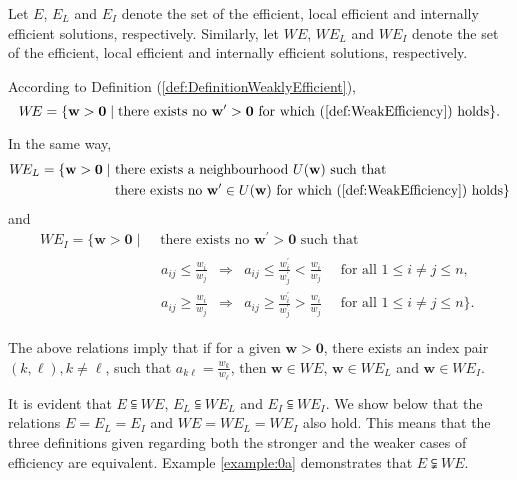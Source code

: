 \documentclass{article}
\theoremstyle{plain}
\begin{document}
Let $E$, $E_L$ and $E_I$
denote the set of the ef{\kern0pt}f{\kern0pt}icient, local ef{\kern0pt}f{\kern0pt}icient and internally ef{\kern0pt}f{\kern0pt}icient solutions, respectively.
Similarly, let $W\!E$, $W\!E_L$ and $W\!E_I$
denote the set of the ef{\kern0pt}f{\kern0pt}icient, local ef{\kern0pt}f{\kern0pt}icient and internally ef{\kern0pt}f{\kern0pt}icient solutions, respectively.

According to Def{\kern0pt}inition  (\ref{def:DefinitionWeaklyEfficient}),
$$  W\!E = \{\mathbf{w}>\mathbf{0}\mid\text{there exists no }\mathbf{w^{\prime}}>\mathbf{0} \text{ for which (\ref{def:WeakEfficiency}) holds}\}.
$$

In the same way,
\begin{align}
  W\!E_L  =\{\mathbf{w}>\mathbf{0}\mid  &\text{ there exists a neighbourhood }
U(\mathbf{w}) \text{ such that} \nonumber \\
  &\text{ there exists no }  \mathbf{w^{\prime}} \in U(\mathbf{w}) \text{ for which }
(\ref{def:WeakEfficiency})
\text{ holds}\} \nonumber
\end{align}
and
\begin{align}
W\!E_I = \{\mathbf{w}>\mathbf{0}\mid  &
 \text{ there exists no }\mathbf{w^{\prime}}>\mathbf{0}
\text{ such that}\nonumber \\
&\begin{array}{lll}
a_{ij} \leq \frac{w_i}{w_j} & \Longrightarrow &
a_{ij} \leq \frac{w^{\prime}_i}{w^{\prime}_j} <\frac{w_i}{w_j}
\quad
\text{ for all } 1 \leq i\ne j \leq n,\\
a_{ij} \ge \frac{w_i}{w_j} & \Longrightarrow &
a_{ij} \ge \frac{w^{\prime}_i}{w^{\prime}_j} > \frac{w_i}{w_j}
\quad
\text{ for all } 1 \leq i\ne j \leq n \}.
\end{array}
\nonumber
\end{align}

The above relations imply that if for a given $\mathbf{w}>\mathbf{0}$, there exists an index pair $(k,\ell), k\ne\ell$, such that  $a_{k\ell}= \frac{w_k}{w_\ell}$, then $\mathbf{w}\in W\!E$,  $\mathbf{w}\in W\!E_L$ and  $\mathbf{w}\in W\!E_I$.

It is evident that $E\subseteqq W\!E$,
$E_L\subseteqq W\!E_L$ and $E_I\subseteqq W\!E_I$. We show below that the relations $E=E_L=E_I$ and $W\!E=W\!E_L=W\!E_I$ also hold. This means that the   three def{\kern0pt}initions given regarding both the stronger and the weaker cases of ef{\kern0pt}f{\kern0pt}iciency are equivalent.
Example \ref{example:0a} demonstrates that $E\subsetneqq W\!E$.
\end{document}
